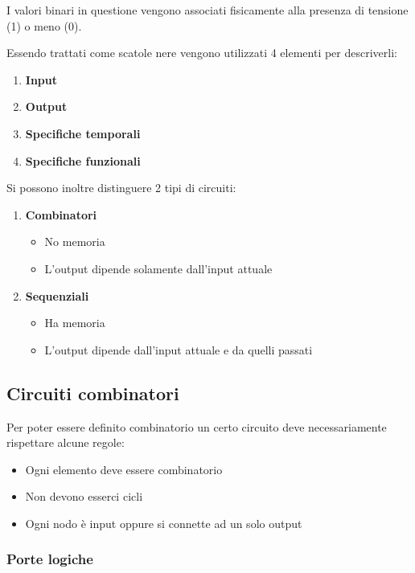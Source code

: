 \documentclass{article}
\begin{document}
\noindent I valori binari in questione vengono associati fisicamente alla presenza di tensione (1) o meno (0).\newline

\raggedright Essendo trattati come scatole nere vengono utilizzati 4 elementi per descriverli:
\begin{enumerate}
    \item \textbf{Input}
    \item \textbf{Output}
    \item \textbf{Specifiche temporali}
    \item \textbf{Specifiche funzionali}
\end{enumerate}

\newpage

Si possono inoltre distinguere 2 tipi di circuiti:
\begin{enumerate}
    \item \textbf{Combinatori}
        \begin{itemize}
            \item No memoria
            \item L'output dipende solamente dall'input attuale
        \end{itemize}
    \item \textbf{Sequenziali}
            \begin{itemize}
            \item Ha memoria
            \item L'output dipende dall'input attuale e da quelli passati
        \end{itemize}
\end{enumerate}

\subsection{Circuiti combinatori}

Per poter essere definito combinatorio un certo circuito deve necessariamente rispettare alcune regole:
\begin{itemize}
    \item Ogni elemento deve essere combinatorio
    \item Non devono esserci cicli
    \item Ogni nodo è input oppure si connette ad un solo output
\end{itemize}

\subsubsection{Porte logiche}
\end{document}
